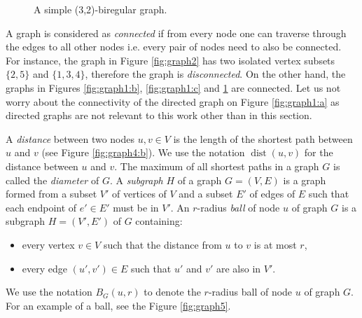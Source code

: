 \begin{figure}[H]
\centering
\caption{A simple (3,2)-biregular graph.\label{fig:graph3}}
\end{figure}


A graph is considered as \emph{connected} if from every node one can traverse through the edges to all other nodes i.e. every pair of nodes need to also be connected.
For instance, the graph in Figure \ref{fig:graph2} has two isolated vertex subsets $\{2, 5\}$ and $\{1, 3, 4\}$, therefore the graph is \emph{disconnected}.
On the other hand, the graphs in Figures \ref{fig:graph1:b}, \ref{fig:graph1:c} and \ref{fig:graph3} are connected.
Let us not worry about the connectivity of the directed graph on Figure \ref{fig:graph1:a} as directed graphs are not relevant to this work other than in this section.

A \emph{distance} between two nodes $u, v\in V$ is the length of the shortest path between $u$ and $v$ (see Figure \ref{fig:graph4:b}).
We use the notation $\operatorname{dist}(u, v)$ for the distance between $u$ and $v$.
The maximum of all shortest paths in a graph $G$ is called the \emph{diameter} of $G$.
A \emph{subgraph} $H$ of a graph $G=(V, E)$ is a graph formed from a subset $V'$ of vertices of $V$ and a subset $E'$ of edges of $E$ such that each endpoint of $e' \in E'$ must be in $V'$.
An $r$-radius \emph{ball} of node $u$ of graph $G$ is a subgraph $H=(V', E')$ of $G$ containing:
\begin{itemize}
  \item every vertex $v\in V$ such that the distance from $u$ to $v$ is at most $r$,
  \item every edge $(u', v') \in E$ such that $u'$ and $v'$ are also in $V'$.
\end{itemize}
We use the notation $B_G(u, r)$ to denote the $r$-radius ball of node $u$ of graph $G$.
For an example of a ball, see the Figure \ref{fig:graph5}.

